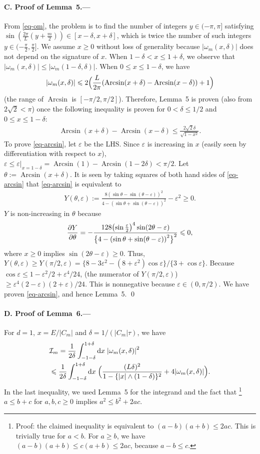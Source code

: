\documentclass[aps,prl,superscriptaddress,reprint]{revtex4-2}
\newcommand{\se}[1]{\paragraph{#1.---}}
\newcommand*{\dd}{\mathop{}\!\mathrm{d}}
\DeclareMathOperator{\Arcsin}{Arcsin}
\theoremstyle{definition}
\newcommand{\abs}[1]{{\left\vert #1 \right\vert}}
\newcommand{\paren}[1]{{\left( #1 \right)}}
\newcommand{\bigparen}[1]{\bigl({#1}\bigr)}
\newcommand{\tht}{\theta}
\newcommand{\pder}[2]{{\partial{#1}\over\partial{#2}}}
\newcommand{\nn}{\notag \\ }
\newcommand{\II}{{\cal I}}
\newcommand{\ta}{\tau}
\renewcommand{\d}{\delta}
\newcommand{\ep}{\varepsilon}
\newcommand{\om}{\omega}
\newcommand{\f}{\frac}
\newcommand{\we}{\wedge}
\renewcommand{\ge}{\geqslant}
\renewcommand{\geq}{\geqslant}
\renewcommand{\le}{\leqslant}
\renewcommand{\leq}{\leqslant}
\begin{document}
\se{C. Proof of Lemma~5}
From \eqref{eq-om}, the problem is to find the number of integers
$y\in(-\pi,\pi]$
satisfying
$\sin\paren{\f{2\pi}L(y+\f m2)}\in[x-\d, x+\d]$,
which is twice the number of such integers
$y\in(-\f\pi2,\f\pi2]$.
We assume $x\ge0$ without loss of generality
because
$\abs{\om_m(x,\d)}$ does not depend on the signature of $x$.
When $1-\d<  x\le 1+\d$, we observe that
$\abs{\om_m(x,\d)}\le\abs{\om_m(1-\d,\d)}$.
When $0\le x\le 1-\d$, we have
\begin{align}
  \abs{\om_m(x,\d)}
  \le 2\Bigl(
  \f {L}{2\pi}\paren{\Arcsin(x+\d)-\Arcsin(x-\d)}
  +1
  \Bigr)
\end{align}
{}(the range of $\Arcsin$ is $[-\pi/2,\pi/2]$).
Therefore, Lemma~5 is proven
(also from $2\sqrt2<\pi$) once the following inequality is proven
for $0 < \delta \leq 1/2$ and $0\le x\le 1-\d$:
\begin{align}
  \Arcsin(x+\d)-\Arcsin(x-\d)
  \le \f{2\sqrt2 \d}{\sqrt{1-x^2}}.
  \label{eq-arcsin}
\end{align}
To prove \eqref{eq-arcsin},
let $\ep$ be the LHS.
Since $\ep$ is increasing in $x$ (easily seen by
differentiation with respect to $x$),
$\ep\le \ep|_{x=1-\d}=
\Arcsin(1)-\Arcsin(1-2\d)<\pi/2$.
Let $\tht:=\Arcsin(x+\d)$.
It is seen by taking squares of both hand sides
of \eqref{eq-arcsin}
that
\eqref{eq-arcsin} is equivalent to
  \begin{align}
    Y(\tht,\ep):=\f{8\paren{\sin\tht-\sin(\tht-\ep)}^2}
    {4-\paren{\sin\tht+\sin(\tht-\ep)}^2}-\ep{}^2
    \ge0.
  \end{align}
$Y$ is non-increasing in $\tht$ because
  \begin{align}
    \pder Y{\tht}
    =
    -\frac
    {128
    \bigparen{\sin\f{\ep}2}^4
    \sin (2 \tht-\ep)
    }
    {\bigl \{
    4-\paren{\sin\tht+\sin(\tht-\ep)}^2
    \bigr \}^2}
    \le0,
  \end{align}
  where $x\ge0$ implies $\sin (2 \tht-\ep )\ge0$.
  Thus,
  $Y(\tht,\ep)\ge Y(\pi/2,\ep)
  =\{8-3 \ep{} ^2-(8
  +\ep{} ^2) \cos \ep\}
  /\{3+\cos\ep\}$.
    Because $\cos\ep\le1-\ep{}^2/2+\ep{}^4/24$,
    (the numerator of $Y(\pi/2,\ep)$)
    $
     \ge \ep{} ^4 (2-\ep ) (2+\ep)/24.
    $
    This is nonnegative because $\ep\in(0,\pi/2)$.
    We have proven \eqref{eq-arcsin},
    and hence Lemma~5.
\qed


\se{D. Proof of Lemma~6}




For $d=1$, $x=E/\abs{C_m}$ and $\d=1/(\abs{C_m}\ta)$,
we have
\begin{align}
 & \II_m
  =
    \f1 {2\d}
    \int_{-1-\d}^{1+\d}
    \dd x\;
  \abs{\om_m(x,\d)}^2
  \nn
  &\le
 \frac{1}{2\d}\int_{-1-\d}^{1+\d}\dd x\;
    \Bigl (
    \f{(L\d)^2}{1-\{\abs x\we (1-\d)\}^2}+4\abs{\om_m(x,\d)}
    \Bigr ) .
    \label{eq-Im-bd}
\end{align}
In the last inequality, we used Lemma~5
for the integrand
and the fact that
\footnote{Proof: the claimed
inequality is equivalent to $(a-b)(a+b) \leq 2 a c$.
This
is trivially true for  $a < b$.
For $a \geq b$, we have
$(a-b)(a+b) \leq c(a+b) \leq 2 a c$, because $a-b \leq c$.}
$a\le b+c$
for $a,b,c\ge0$
implies $a^2\le b^2+ 2ac$.
\end{document}
